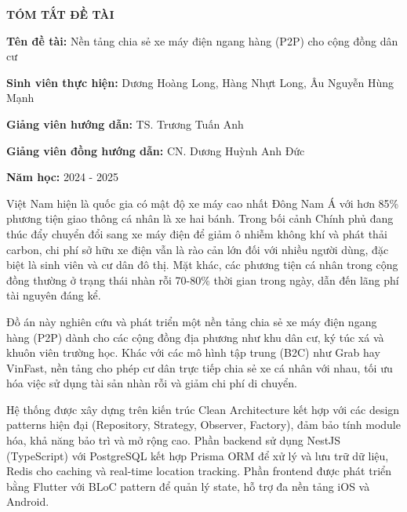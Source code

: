 


\newpage
\thispagestyle{empty}
\begin{center}
    \textbf{\Large TÓM TẮT ĐỀ TÀI}
\end{center}

\vspace{0.5cm}

\noindent\textbf{Tên đề tài:} Nền tảng chia sẻ xe máy điện ngang hàng (P2P) cho cộng đồng dân cư

\noindent\textbf{Sinh viên thực hiện:} Dương Hoàng Long, Hàng Nhựt Long, Âu Nguyễn Hùng Mạnh

\noindent\textbf{Giảng viên hướng dẫn:} TS. Trương Tuấn Anh

\noindent\textbf{Giảng viên đồng hướng dẫn:} CN. Dương Huỳnh Anh Đức


\noindent\textbf{Năm học:} 2024 - 2025

\vspace{0.5cm}

Việt Nam hiện là quốc gia có mật độ xe máy cao nhất Đông Nam Á với hơn 85\% phương tiện giao thông cá nhân là xe hai bánh. 
Trong bối cảnh Chính phủ đang thúc đẩy chuyển đổi sang xe máy điện để giảm ô nhiễm không khí và phát thải carbon, chi phí sở hữu xe điện vẫn là rào cản lớn đối với nhiều người dùng, đặc biệt là sinh viên và cư dân đô thị. 
Mặt khác, các phương tiện cá nhân trong cộng đồng thường ở trạng thái nhàn rỗi 70-80\% thời gian trong ngày, dẫn đến lãng phí tài nguyên đáng kể.

Đồ án này nghiên cứu và phát triển một nền tảng chia sẻ xe máy điện ngang hàng (P2P) dành cho các cộng đồng địa phương như khu dân cư, ký túc xá và khuôn viên trường học. 
Khác với các mô hình tập trung (B2C) như Grab hay VinFast, nền tảng cho phép cư dân trực tiếp chia sẻ xe cá nhân với nhau, tối ưu hóa việc sử dụng tài sản nhàn rỗi và giảm chi phí di chuyển.

Hệ thống được xây dựng trên kiến trúc Clean Architecture kết hợp với các design patterns hiện đại (Repository, Strategy, Observer, Factory), đảm bảo tính module hóa, khả năng bảo trì và mở rộng cao. 
Phần backend sử dụng NestJS (TypeScript) với PostgreSQL kết hợp Prisma ORM để xử lý và lưu trữ dữ liệu, Redis cho caching và real-time location tracking. 
Phần frontend được phát triển bằng Flutter với BLoC pattern để quản lý state, hỗ trợ đa nền tảng iOS và Android.

